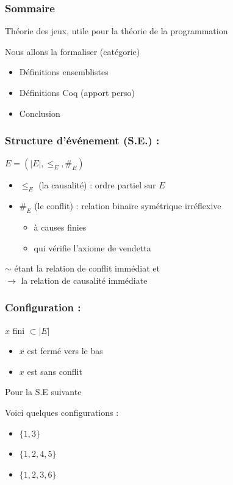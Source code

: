 \documentclass{beamer}
\title{\letitle}
\author{\leauthor}
\institute{}
\date{}
\begin{document}
\maketitle
\begin{frame}
\frametitle{Sommaire}

Théorie des jeux, utile pour la théorie de la programmation

Nous allons la formaliser (catégorie)
\pause
\begin{itemize}
\item Définitions ensemblistes
\item Définitions Coq (apport perso)
\item Conclusion
\end{itemize}
\end{frame}


\begin{frame}
\frametitle{Structure d'événement (S.E.) :}

$E = (|E|, \leq_E, \#_E)$
\begin{itemize}
\item $\leq_E$ (la causalité) : ordre partiel sur $E$
\item $\#_E$ (le conflit) : relation binaire symétrique irréflexive
\begin{itemize}
\item à causes finies
\item qui vérifie l'axiome de vendetta
\end{itemize}
\end{itemize}
\pause


$\sim$ étant la relation de conflit immédiat et\\
$\rightarrow$ la relation de causalité immédiate
\end{frame}

\begin{frame}
\frametitle{Configuration :}


$x$ fini $\subset |E|$
\begin{itemize}
\item $x$ est fermé vers le bas
\item $x$ est sans conflit
\end{itemize}
\pause

Pour la S.E suivante


Voici quelques configurations :
\begin{itemize}
\item $\{1,3\}$
\pause
\item $\{1,2,4,5\}$
\pause
\item $\{1,2,3,6\}$
\end{itemize}

\end{frame}
\end{document}
